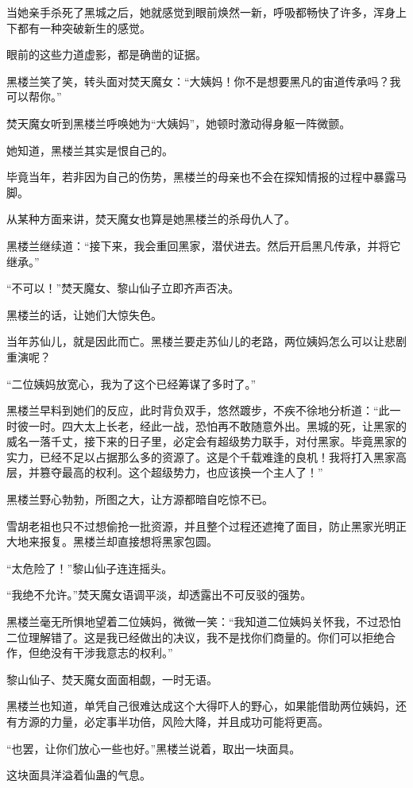 \begin{this_body}
当她亲手杀死了黑城之后，她就感觉到眼前焕然一新，呼吸都畅快了许多，浑身上下都有一种突破新生的感觉。

眼前的这些力道虚影，都是确凿的证据。

黑楼兰笑了笑，转头面对焚天魔女：“大姨妈！你不是想要黑凡的宙道传承吗？我可以帮你。”

焚天魔女听到黑楼兰呼唤她为“大姨妈”，她顿时激动得身躯一阵微颤。

她知道，黑楼兰其实是恨自己的。

毕竟当年，若非因为自己的伤势，黑楼兰的母亲也不会在探知情报的过程中暴露马脚。

从某种方面来讲，焚天魔女也算是她黑楼兰的杀母仇人了。

黑楼兰继续道：“接下来，我会重回黑家，潜伏进去。然后开启黑凡传承，并将它继承。”

“不可以！”焚天魔女、黎山仙子立即齐声否决。

黑楼兰的话，让她们大惊失色。

当年苏仙儿，就是因此而亡。黑楼兰要走苏仙儿的老路，两位姨妈怎么可以让悲剧重演呢？

“二位姨妈放宽心，我为了这个已经筹谋了多时了。”

黑楼兰早料到她们的反应，此时背负双手，悠然踱步，不疾不徐地分析道：“此一时彼一时。四大太上长老，经此一战，恐怕再不敢随意外出。黑城的死，让黑家的威名一落千丈，接下来的日子里，必定会有超级势力联手，对付黑家。毕竟黑家的实力，已经不足以占据那么多的资源了。这是个千载难逢的良机！我将打入黑家高层，并篡夺最高的权利。这个超级势力，也应该换一个主人了！”

黑楼兰野心勃勃，所图之大，让方源都暗自吃惊不已。

雪胡老祖也只不过想偷抢一批资源，并且整个过程还遮掩了面目，防止黑家光明正大地来报复。黑楼兰却直接想将黑家包圆。

“太危险了！”黎山仙子连连摇头。

“我绝不允许。”焚天魔女语调平淡，却透露出不可反驳的强势。

黑楼兰毫无所惧地望着二位姨妈，微微一笑：“我知道二位姨妈关怀我，不过恐怕二位理解错了。这是我已经做出的决议，我不是找你们商量的。你们可以拒绝合作，但绝没有干涉我意志的权利。”

黎山仙子、焚天魔女面面相觑，一时无语。

黑楼兰也知道，单凭自己很难达成这个大得吓人的野心，如果能借助两位姨妈，还有方源的力量，必定事半功倍，风险大降，并且成功可能将更高。

“也罢，让你们放心一些也好。”黑楼兰说着，取出一块面具。

这块面具洋溢着仙蛊的气息。


\end{this_body}
